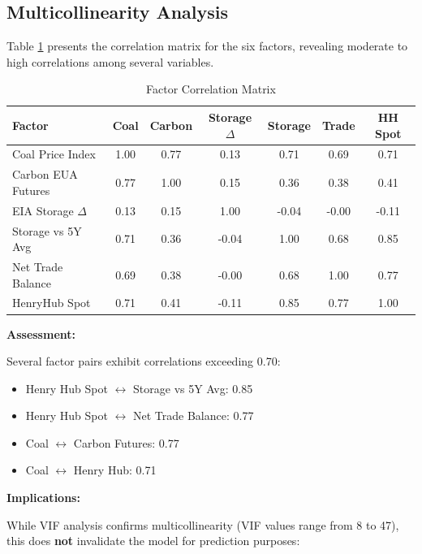 \documentclass[12pt,a4paper]{article}
\begin{document}
\subsection{Multicollinearity Analysis}

Table \ref{tab:factor_correlation} presents the correlation matrix for the six factors, revealing moderate to high correlations among several variables.

\begin{table}[H]
\centering
\caption{Factor Correlation Matrix}
\label{tab:factor_correlation}
\small
\begin{tabular}{@{}lcccccc@{}}
\toprule
\textbf{Factor} & \textbf{Coal} & \textbf{Carbon} & \textbf{Storage $\Delta$} & \textbf{Storage} & \textbf{Trade} & \textbf{HH Spot} \\
\midrule
Coal Price Index & 1.00 & 0.77 & 0.13 & 0.71 & 0.69 & 0.71 \\
Carbon EUA Futures & 0.77 & 1.00 & 0.15 & 0.36 & 0.38 & 0.41 \\
EIA Storage $\Delta$ & 0.13 & 0.15 & 1.00 & -0.04 & -0.00 & -0.11 \\
Storage vs 5Y Avg & 0.71 & 0.36 & -0.04 & 1.00 & 0.68 & 0.85 \\
Net Trade Balance & 0.69 & 0.38 & -0.00 & 0.68 & 1.00 & 0.77 \\
HenryHub Spot & 0.71 & 0.41 & -0.11 & 0.85 & 0.77 & 1.00 \\
\bottomrule
\end{tabular}
\end{table}

\textbf{Assessment:}

Several factor pairs exhibit correlations exceeding 0.70:
\begin{itemize}
    \item Henry Hub Spot $\leftrightarrow$ Storage vs 5Y Avg: 0.85
    \item Henry Hub Spot $\leftrightarrow$ Net Trade Balance: 0.77
    \item Coal $\leftrightarrow$ Carbon Futures: 0.77
    \item Coal $\leftrightarrow$ Henry Hub: 0.71
\end{itemize}

\textbf{Implications:}

While VIF analysis confirms multicollinearity (VIF values range from 8 to 47), this does \textbf{not} invalidate the model for prediction purposes:
\end{document}
